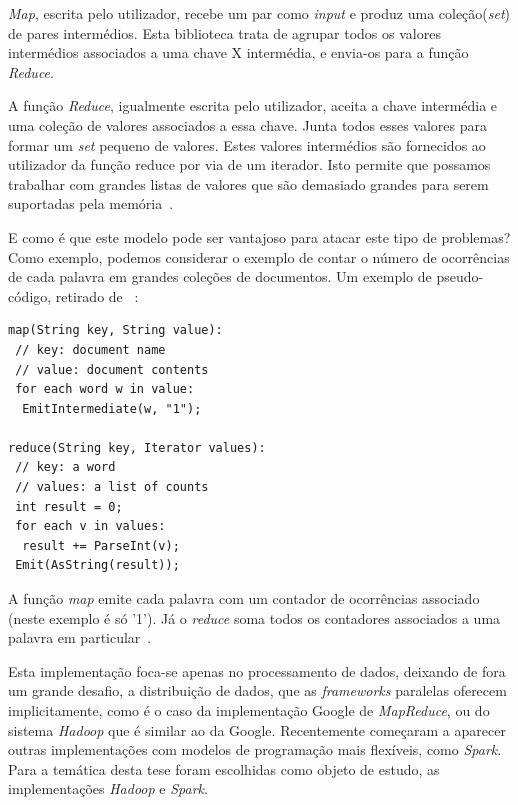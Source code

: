 \textit{Map}, escrita pelo utilizador, recebe um par como \textit{input} e produz uma coleção(\textit{set}) de pares intermédios. Esta biblioteca trata de agrupar todos os valores intermédios associados a uma chave X intermédia, e envia-os para a função \textit{Reduce}.

A função \textit{Reduce}, igualmente escrita pelo utilizador, aceita a chave intermédia e uma coleção de valores associados a essa chave. Junta todos esses valores para formar um \textit{set} pequeno de valores. Estes valores intermédios são fornecidos ao utilizador da função reduce por via de um iterador. Isto permite que possamos trabalhar com grandes listas de valores que são demasiado grandes para serem suportadas pela memória~\cite{lin2010data}.

E como é que este modelo pode ser vantajoso para atacar este tipo de problemas? Como exemplo, podemos considerar o exemplo de contar o número de ocorrências de cada palavra em grandes coleções de documentos. Um exemplo de pseudo-código, retirado de ~\cite{dean2008mapreduce}:
\begin{lstlisting}
map(String key, String value):
 // key: document name
 // value: document contents
 for each word w in value:
  EmitIntermediate(w, "1");

reduce(String key, Iterator values):
 // key: a word
 // values: a list of counts
 int result = 0;
 for each v in values:
  result += ParseInt(v);
 Emit(AsString(result));
\end{lstlisting}

A função \textit{map} emite cada palavra com um contador de ocorrências associado (neste exemplo é só '1'). Já o \textit{reduce} soma todos os contadores associados a uma palavra em particular~\cite{lin2010data}.

Esta implementação foca-se apenas no processamento de dados, deixando de fora um grande desafio, a distribuição de dados, que as \textit{frameworks} paralelas oferecem implicitamente, como é o caso da implementação Google de \textit{MapReduce}, ou do sistema \textit{Hadoop} que é similar ao da Google. Recentemente começaram a aparecer outras implementações com modelos de programação mais flexíveis, como \textit{Spark}. Para a temática desta tese foram escolhidas como objeto de estudo, as implementações \textit{Hadoop} e \textit{Spark}.


